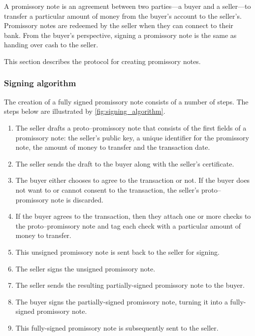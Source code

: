 \documentclass[12pt,a4paper]{article}
\begin{document}
\begin{multicols}{2}
	A promissory note is an agreement between two parties---a buyer and a seller---to transfer a particular amount of money from the buyer's account to the seller's. Promissory notes are redeemed by the seller when they can connect to their bank. From the buyer's perspective, signing a promissory note is the same as handing over cash to the seller. 
	
	This section describes the protocol for creating promissory notes.

	\subsubsection{Signing algorithm}
	
	The creation of a fully signed promissory note consists of a number of steps. The steps below are illustrated by \autoref{fig:signing_algorithm}.
	
	\begin{enumerate}
		\item The seller drafts a proto--promissory note that consists of the first fields of a promissory note: the seller's public key, a unique identifier for the promissory note, the amount of money to transfer and the transaction date.
		
		\item The seller sends the draft to the buyer along with the seller's certificate.
		
		\item The buyer either chooses to agree to the transaction or not. If the buyer does not want to or cannot consent to the transaction, the seller's proto--promissory note is discarded.
		
		\item If the buyer agrees to the transaction, then they attach one or more checks to the proto--promissory note and tag each check with a particular amount of money to transfer. 
		
		\item This unsigned promissory note is sent back to the seller for signing.
		
		\item The seller signs the unsigned promissory note.
		
		\item The seller sends the resulting partially-signed promissory note to the buyer.
		
		\item The buyer signs the partially-signed promissory note, turning it into a fully-signed promissory note.
		
		\item This fully-signed promissory note is subsequently sent to the seller.
	\end{enumerate}

	\end{multicols}
	\newpage
	
\end{document}

